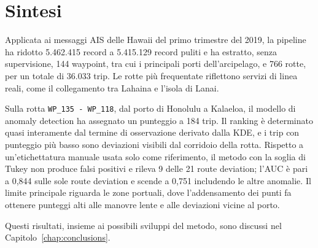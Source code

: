 \section{Sintesi}\label{sec:res_summary}

Applicata ai messaggi AIS delle Hawaii del primo trimestre del 2019, la pipeline ha ridotto
5.462.415 record a 5.415.129 record puliti e ha estratto, senza supervisione, 144 waypoint, tra cui
i principali porti dell'arcipelago, e 766 rotte, per un totale di 36.033 trip.
Le rotte più frequentate riflettono servizi di linea reali, come il collegamento tra Lahaina e
l'isola di Lanai.

Sulla rotta \texttt{WP\_135 - WP\_118}, dal porto di Honolulu a Kalaeloa, il modello di anomaly
detection ha assegnato un punteggio a 184 trip. Il ranking è determinato quasi interamente dal
termine di osservazione derivato dalla KDE, e i trip con punteggio più basso sono deviazioni
visibili dal corridoio della rotta. Rispetto a un'etichettatura manuale usata solo come
riferimento, il metodo con la soglia di Tukey non produce falsi positivi e rileva 9 delle 21
route deviation; l'AUC è pari a 0,844 sulle sole route deviation e scende a 0,751 includendo
le altre anomalie. Il limite principale riguarda le zone portuali, dove l'addensamento dei
punti fa ottenere punteggi alti alle manovre lente e alle deviazioni vicine al porto.

Questi risultati, insieme ai possibili sviluppi del metodo, sono discussi nel
Capitolo~\ref{chap:conclusions}.
